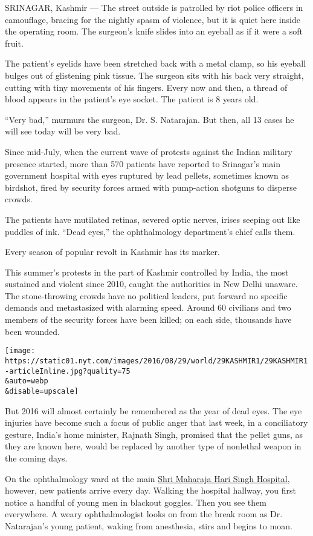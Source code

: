 SRINAGAR, Kashmir --- The street outside is patrolled by riot police
officers in camouflage, bracing for the nightly spasm of violence, but
it is quiet here inside the operating room. The surgeon's knife slides
into an eyeball as if it were a soft fruit.

The patient's eyelids have been stretched back with a metal clamp, so
his eyeball bulges out of glistening pink tissue. The surgeon sits with
his back very straight, cutting with tiny movements of his fingers.
Every now and then, a thread of blood appears in the patient's eye
socket. The patient is 8 years old.

``Very bad,'' murmurs the surgeon, Dr. S. Natarajan. But then, all 13
cases he will see today will be very bad.

Since mid-July, when the current wave of protests against the Indian
military presence started, more than 570 patients have reported to
Srinagar's main government hospital with eyes ruptured by lead pellets,
sometimes known as birdshot, fired by security forces armed with
pump-action shotguns to disperse crowds.

The patients have mutilated retinas, severed optic nerves, irises
seeping out like puddles of ink. ``Dead eyes,'' the ophthalmology
department's chief calls them.

Every season of popular revolt in Kashmir has its marker.

This summer's protests in the part of Kashmir controlled by India, the
most sustained and violent since 2010, caught the authorities in New
Delhi unaware. The stone-throwing crowds have no political leaders, put
forward no specific demands and metastasized with alarming speed. Around
60 civilians and two members of the security forces have been killed; on
each side, thousands have been wounded.

\texttt{[image: https://static01.nyt.com/images/2016/08/29/world/29KASHMIR1/29KASHMIR1-articleInline.jpg?quality=75\\\&auto=webp\\\&disable=upscale]}

But 2016 will almost certainly be remembered as the year of dead eyes.
The eye injuries have become such a focus of public anger that last
week, in a conciliatory gesture, India's home minister, Rajnath Singh,
promised that the pellet guns, as they are known here, would be replaced
by another type of nonlethal weapon in the coming days.

On the ophthalmology ward at the main
\href{http://www.gmcsrinagar.net/asstd_hosp/smhs.htm}{Shri Maharaja Hari
Singh Hospital}, however, new patients arrive every day. Walking the
hospital hallway, you first notice a handful of young men in blackout
goggles. Then you see them everywhere. A weary ophthalmologist looks on
from the break room as Dr. Natarajan's young patient, waking from
anesthesia, stirs and begins to moan.

